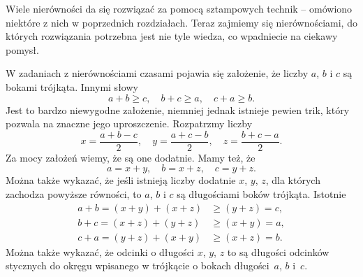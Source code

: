 

\noindent
Wiele nierówności da się rozwiązać za pomocą sztampowych technik -- omówiono niektóre z nich w poprzednich rozdziałach. Teraz zajmiemy się nierównościami, do których rozwiązania potrzebna jest nie tyle wiedza, co wpadniecie na ciekawy pomysł. 

\vspace{10px}



\noindent
W zadaniach z nierównościami czasami pojawia się założenie, że liczby $a$, $b$ i $c$ są bokami trójkąta. Innymi słowy
\[
	a + b \geqslant c, \quad b + c \geqslant a, \quad c + a \geqslant b.
\]
Jest to bardzo niewygodne założenie, niemniej jednak istnieje pewien trik, który pozwala na znaczne jego uproszczenie. Rozpatrzmy liczby
\[
	x = \frac{a + b - c}{2}, \quad y = \frac{a + c - b}{2}, \quad z = \frac{b + c - a}{2}.
\]
Za mocy założeń wiemy, że są one dodatnie. Mamy też, że
\[
	a = x + y, \quad b = x + z, \quad c = y + z.
\]
Można także wykazać, że jeśli istnieją liczby dodatnie $x$, $y$, $z$, dla których zachodza powyższe równości, to $a$, $b$ i $c$ są długościami boków trójkąta. Istotnie
\begin{align*}
	a + b = (x + y) + (x + z) &\geqslant (y + z) = c, \\
	b + c = (x + z) + (y + z) &\geqslant (x + y) = a, \\
	c + a = (y + z) + (x + y) &\geqslant (x + z) = b.
\end{align*}
Można także wykazać, że odcinki o długości $x$, $y$, $z$ to są długości odcinków stycznych do okręgu wpisanego w trójkącie o bokach długości~$a$, $b$ i~$c$.

\begin{center}
\end{center}

